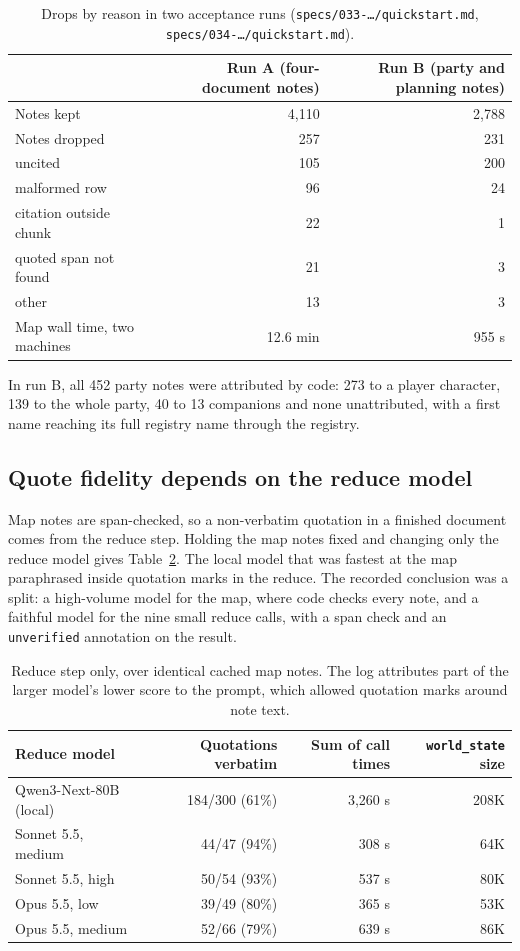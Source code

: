 \documentclass[11pt]{article}
\newcommand{\code}[1]{\texttt{#1}}
\begin{document}
\begin{table}[t]
\centering
\small
\begin{tabular}{@{}lrr@{}}
\toprule
& Run A (four-document notes) & Run B (party and planning notes) \\
\midrule
Notes kept & 4{,}110 & 2{,}788 \\
Notes dropped & 257 & 231 \\
\quad uncited & 105 & 200 \\
\quad malformed row & 96 & 24 \\
\quad citation outside chunk & 22 & 1 \\
\quad quoted span not found & 21 & 3 \\
\quad other & 13 & 3 \\
Map wall time, two machines & 12.6 min & 955 s \\
\bottomrule
\end{tabular}
\caption{Drops by reason in two acceptance runs
(\code{specs/033-\ldots/quickstart.md}, \code{specs/034-\ldots/quickstart.md}).}
\label{tab:drops}
\end{table}

In run B, all 452 party notes were attributed by code: 273 to a player character, 139 to
the whole party, 40 to 13 companions and none unattributed, with a first name reaching
its full registry name through the registry.

\subsection{Quote fidelity depends on the reduce model}

Map notes are span-checked, so a non-verbatim quotation in a finished document comes
from the reduce step. Holding the map notes fixed and changing only the reduce model
gives Table~\ref{tab:reduce}. The local model that was fastest at the map paraphrased
inside quotation marks in the reduce. The recorded conclusion was a split: a high-volume
model for the map, where code checks every note, and a faithful model for the nine small
reduce calls, with a span check and an \code{unverified} annotation on the result.

\begin{table}[t]
\centering
\small
\begin{tabular}{@{}lrrr@{}}
\toprule
Reduce model & Quotations verbatim & Sum of call times & \code{world\_state} size \\
\midrule
Qwen3-Next-80B (local) & 184/300 (61\%) & 3{,}260 s & 208K \\
Sonnet 5.5, medium & 44/47 (94\%) & 308 s & 64K \\
Sonnet 5.5, high & 50/54 (93\%) & 537 s & 80K \\
Opus 5.5, low & 39/49 (80\%) & 365 s & 53K \\
Opus 5.5, medium & 52/66 (79\%) & 639 s & 86K \\
\bottomrule
\end{tabular}
\caption{Reduce step only, over identical cached map notes. The log attributes part of
the larger model's lower score to the prompt, which allowed quotation marks around note
text.}
\label{tab:reduce}
\end{table}
\end{document}
